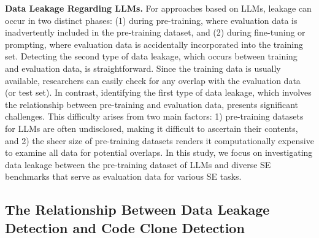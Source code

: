 \vspace{0.2cm}
\noindent\textbf{Data Leakage Regarding LLMs.}
For approaches based on LLMs, leakage can occur in two distinct phases: (1) during pre-training, where evaluation data is inadvertently included in the pre-training dataset, and (2) during fine-tuning or prompting, where evaluation data is accidentally incorporated into the training set.
Detecting the second type of data leakage, which occurs between training and evaluation data, is straightforward. Since the training data is usually available, researchers can easily check for any overlap with the evaluation data (or test set). In contrast, identifying the first type of data leakage, which involves the relationship between pre-training and evaluation data, presents significant challenges. This difficulty arises from two main factors: 1) pre-training datasets for LLMs are often undisclosed, making it difficult to ascertain their contents, and 2) the sheer size of pre-training datasets renders it computationally expensive to examine all data for potential overlaps.
In this study, we focus on investigating data leakage between the pre-training dataset of LLMs and diverse SE benchmarks that serve as evaluation data for various SE tasks.



\subsection{The Relationship Between Data Leakage Detection and Code Clone Detection}

